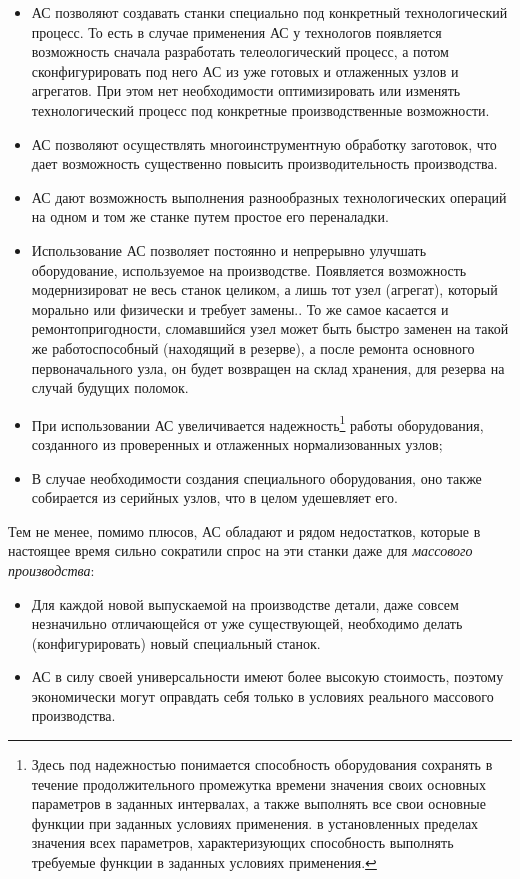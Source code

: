 \begin{itemize}
	\item АС позволяют создавать станки специально под конкретный технологический процесс. То есть в случае применения АС у технологов появляется возможность сначала разработать телеологический процесс, а потом сконфигурировать под него АС из уже готовых и отлаженных узлов и агрегатов. При этом нет необходимости оптимизировать или изменять технологический процесс под конкретные производственные возможности.
	\item АС позволяют осуществлять многоинструментную обработку заготовок, что дает возможность существенно повысить производительность производства.
	\item АС дают возможность выполнения разнообразных технологических операций на одном и том же станке путем простое его переналадки.
	\item Использование АС позволяет постоянно и непрерывно улучшать оборудование, используемое на производстве. Появляется возможность модернизироват не весь станок целиком, а лишь тот узел (агрегат), который морально или физически и требует замены.. То же самое касается и ремонтопригодности, сломавшийся узел может быть быстро заменен на такой же работоспособный (находящий в резерве), а после ремонта основного первоначального узла, он будет возвращен на склад хранения, для резерва на случай будущих поломок.
	\item При использовании АС увеличивается надежность\footnote{Здесь под надежностью понимается способность оборудования сохранять в течение продолжительного промежутка времени значения своих основных параметров в заданных интервалах, а также выполнять все свои основные функции при заданных условиях применения. в установленных пределах значения всех параметров, характеризующих способность выполнять требуемые функции в заданных условиях применения.} работы оборудования, созданного из проверенных и отлаженных нормализованных узлов;
	\item В случае необходимости создания специального оборудования, оно также собирается из серийных узлов, что в целом удешевляет его.
\end{itemize}

Тем не менее, помимо плюсов, АС обладают и рядом недостатков, которые в настоящее время сильно сократили спрос на эти станки даже для \textit{массового производства}:

\begin{itemize}
	\item Для каждой новой выпускаемой на производстве детали, даже совсем незначильно отличающейся от уже существующей, необходимо делать (конфигурировать) новый специальный станок.
	\item АС в силу своей универсальности имеют более высокую стоимость, поэтому экономически могут оправдать себя только в условиях реального массового производства.
\end{itemize}

